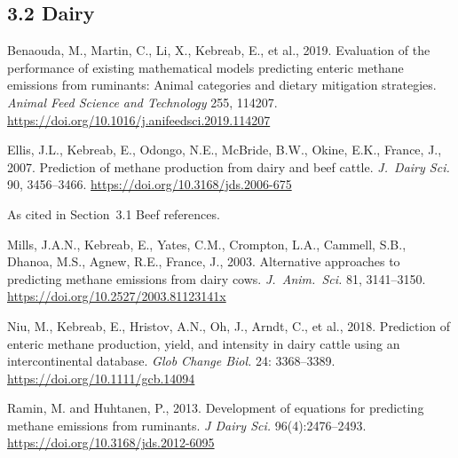 \subsection*{3.2 Dairy}
\begin{description}[leftmargin=0pt, style=nextline]

    \item[Benaouda et al., 2019]
        Benaouda, M., Martin, C., Li, X., Kebreab, E., et al., 2019. Evaluation of the
        performance of existing mathematical models predicting enteric methane emissions
        from ruminants: Animal categories and dietary mitigation strategies.
        \textit{Animal Feed Science and Technology} 255, 114207.
        \url{https://doi.org/10.1016/j.anifeedsci.2019.114207}

    \item[Ellis et al., 2007]
        Ellis, J.L., Kebreab, E., Odongo, N.E., McBride, B.W., Okine, E.K., France,
        J., 2007. Prediction of methane production from dairy and beef cattle.
        \textit{J.\ Dairy Sci.} 90, 3456--3466.
        \url{https://doi.org/10.3168/jds.2006-675}

    \item[IPCC, 2019]
        As cited in Section~3.1 Beef references.

    \item[Mills et al., 2003]
        Mills, J.A.N., Kebreab, E., Yates, C.M., Crompton, L.A., Cammell, S.B.,
        Dhanoa, M.S., Agnew, R.E., France, J., 2003. Alternative approaches to
        predicting methane emissions from dairy cows. \textit{J.\ Anim.\ Sci.} 81,
        3141--3150.
        \url{https://doi.org/10.2527/2003.81123141x}

    \item[Niu et al., 2018]
        Niu, M., Kebreab, E., Hristov, A.N., Oh, J., Arndt, C., et al., 2018.
        Prediction of enteric methane production, yield, and intensity in dairy cattle
        using an intercontinental database. \textit{Glob Change Biol.} 24: 3368--3389.
        \url{https://doi.org/10.1111/gcb.14094}

    \item[Ramin \& Huhtanen, 2013]
        Ramin, M. and Huhtanen, P., 2013. Development of equations for predicting
        methane emissions from ruminants. \textit{J Dairy Sci.} 96(4):2476--2493.
        \url{https://doi.org/10.3168/jds.2012-6095}

\end{description}

